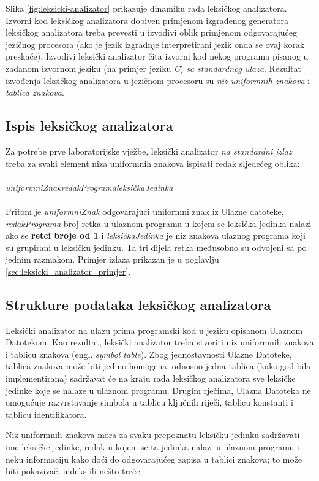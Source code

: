 \documentclass[times, 12pt, utf8]{book}
\begin{document}
Slika \ref{fig:leksicki-analizator} prikazuje dinamiku rada leksičkog analizatora.
Izvorni kod leksičkog analizatora dobiven primjenom izgrađenog generatora leksičkog analizatora treba prevesti u izvodivi oblik primjenom odgovarajućeg jezičnog procesora (ako je jezik izgradnje interpretirani jezik onda se ovaj korak preskače).
Izvodivi leksički analizator čita izvorni kod nekog programa pisanog u zadanom izvornom jeziku (na primjer jeziku \emph{C}) \emph{sa standardnog ulaza}.
Rezultat izvođenja leksičkog analizatora u jezičnom procesoru su \emph{niz uniformnih znakova} i \emph{tablica znakova}.

\subsection{Ispis leksičkog analizatora}
Za potrebe prve laboratorijske vježbe, leksički analizator \emph{na standardni izlaz} treba za svaki element niza uniformnih znakova ispisati redak sljedećeg oblika:\\
\\
\emph{uniformniZnak}\textvisiblespace\emph{redakPrograma}\textvisiblespace\emph{leksičkaJedinka}\\
\\
Pritom je \emph{uniformniZnak} odgovarajući uniformni znak iz Ulazne datoteke, \emph{redakPrograma} broj retka u ulaznom programu u kojem se leksička jedinka nalazi ako se \textbf{retci broje od 1} i \emph{leksičkaJedinka} je niz znakova ulaznog programa koji su grupirani u leksičku jedinku.
Ta tri dijela retka međusobno su odvojeni sa po jednim razmakom.
Primjer izlaza prikazan je u poglavlju \ref{sec:leksicki_analizator_primjer}.

\subsection{Strukture podataka leksičkog analizatora}
Leksički analizator na ulazu prima programski kod u jeziku opisanom Ulaznom Datotekom.
Kao rezultat, leksički analizator treba stvoriti niz uniformnih znakova i tablicu znakova (engl. \emph{symbol table}).
Zbog jednostavnosti Ulazne Datoteke, tablica znakova može biti jedino homogena, odnosno jedna tablica (kako god bila implementirana) sadržavat će na kraju rada leksičkog analizatora sve leksičke jedinke koje se nalaze u ulaznom programu.
Drugim rječima, Ulazna Datoteka ne omogućuje razvrstavanje simbola u tablicu ključnih riječi, tablicu konstanti i tablicu identifikatora.

Niz uniformnih znakova mora za svaku prepoznatu leksičku jedinku sadržavati ime leksičke jedinke, redak u kojem se ta jedinka nalazi u ulaznom programu i neku informaciju kako doći do odgovarajućeg zapisa u tablici znakova; to može biti pokazivač, indeks ili nešto treće.
\end{document}
